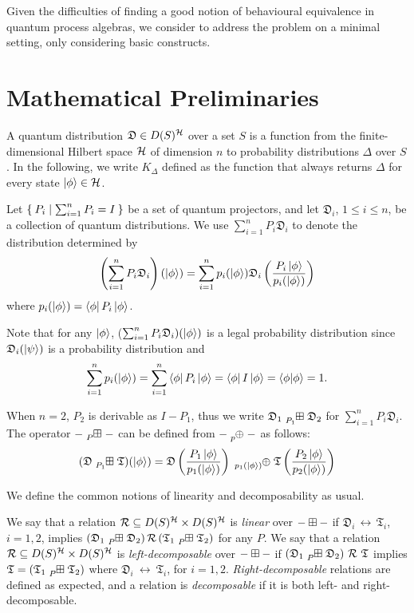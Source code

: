 \newcommand{\quantumdst}{\mathfrak{D}}
\newcommand{\quantumdsta}{\mathfrak{T}}

Given the difficulties of finding a good notion of behavioural equivalence in quantum process algebras, we consider to address the problem on a minimal setting, only considering basic constructs.

\section{Mathematical Preliminaries}

A quantum distribution $\quantumdst \in D(S)^\hilbert$ over a set $S$ is a function from the finite-dimensional Hilbert space $\mathcal{H}$ of dimension $n$ to probability distributions $\Delta$ over $S$.
In the following, we write $K_{\Delta}$ defined as the function that always returns $\Delta$ for every state $\ket{\phi} \in \mathcal{H}$.

Let $\Set{P_i | \sum_{i = 1}^{n} P_i = I }$ be a set of quantum projectors, and let $\quantumdst_i$, $1 \leq i \leq n$, be a collection of quantum distributions.
We use $\sum_{i = 1}^{n} P_i \quantumdst_i$ to denote the distribution determined by 
\[
\left(\sum_{i = 1}^{n} P_i \quantumdst_i\right) (\ket{\phi}) = \sum_{i = 1}^{n} p_i(\ket{\phi}) \quantumdst_i \left(\frac{P_i \ket{\phi}}{p_i(\ket{\phi})}\right)
\]
where $p_i(\ket{\phi}) = \bra{\phi} P_i \ket{\phi}$.

Note that for any $\ket{\phi}$, ($\sum_{i = 1}^{n} P_i \quantumdst_i) (\ket{\phi})$ is a legal probability distribution since $\quantumdst_i(\ket{\psi})$ is a probability distribution and
\[
\sum_{i = 1}^{n} p_i (\ket{\phi}) = \sum_{i = 1}^{n} \bra{\phi} P_i \ket{\phi} = \bra{\phi} I \ket{\phi} = \braket{\phi | \phi} = 1.
\]

When $n = 2$, $P_2$ is derivable as $I - P_1$, thus we write $\quantumdst_1 \qsum{P_1} \quantumdst_2$ for $\sum_{i = 1}^{n} P_i \quantumdst_i$.
The operator $\blank \qsum{P} \blank$ can be defined from $\blank \tensor[_p]{\oplus}{} \blank$ as follows:
\[
  (\quantumdst \qsum{P_1} \quantumdsta) (\ket{\phi}) = \quantumdst \left(\frac{P_1 \ket{\phi}}{p_1(\ket{\phi})}\right) \tensor[_{p_1(\ket{\phi})}]{\oplus}{} \quantumdsta \left(\frac{P_2 \ket{\phi}}{p_2(\ket{\phi})}\right)
\]

We define the common notions of linearity and decomposability as usual.
\begin{definition}
We say that a relation $\mathcal{R} \subseteq D(S)^{\mathcal{H}} \times D(S)^{\mathcal{H}}$ is \emph{linear} over ${-} \boxplus {-}$ if $\quantumdst_i\,\rel\,\quantumdsta_i$, $i = 1,2$, implies $(\quantumdst_1 \qsum{P} \quantumdst_2)\,\rel\,(\quantumdsta_1 \qsum{P} \quantumdsta_2)$ for any $P$.
We say that a relation $\mathcal{R} \subseteq D(S)^{\mathcal{H}} \times D(S)^{\mathcal{H}}$ is \emph{left-decomposable} over ${-} \boxplus {-}$ if $(\quantumdst_1 \qsum{P} \quantumdst_2)\ \rel\ \quantumdsta$ implies $\quantumdsta = (\quantumdsta_1 \qsum{P} \quantumdsta_2)$ where $\quantumdst_i\ \rel\ \quantumdsta_i$, for $i = 1, 2$.
\emph{Right-decomposable} relations are defined as expected, and a relation is \emph{decomposable} if it is both left- and right-decomposable. 
\end{definition}

